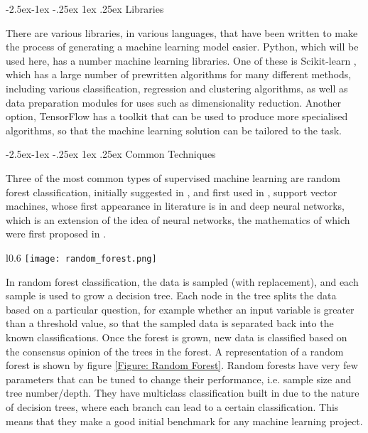 \documentclass[12pt]{article}
\makeatletter
\renewcommand\subsubsection{\@startsection{subsubsection}{4}{\z@}
            {-2.5ex\@plus -1ex \@minus -.25ex}
            {1ex \@plus .25ex}
            {\normalfont\large\bfseries}}
\makeatother
\begin{document}
			\subsubsection{Libraries}			
			
				There are various libraries, in various languages, that have been written to make the process of generating a machine learning model easier.  Python, which will be used here, has a number machine learning libraries.  One of these is Scikit-learn \citep{RefWorks:doc:5d80f150e4b07f40b9eab2f8}, which has a large number of prewritten algorithms for many different methods, including various classification, regression and clustering algorithms, as well as data preparation modules for uses such as dimensionality reduction.  Another option, TensorFlow \citep{RefWorks:doc:5d80f20de4b08a779635c81d} has a toolkit that can be used to produce more specialised algorithms, so that the machine learning solution can be tailored to the task.
				
			\subsubsection{Common Techniques}

				Three of the most common types of supervised machine learning are random forest classification, initially suggested in \cite{RefWorks:doc:5d84b84de4b03ee47d60013e}, and first used in \cite{RefWorks:doc:5d84b954e4b01cdccc094821}, support vector machines, whose first appearance in literature is in \cite{RefWorks:doc:5d84bca0e4b074abc390dc95} and deep neural networks, which is an extension of the idea of neural networks, the mathematics of which were first proposed in \cite{RefWorks:doc:5d84d2d4e4b048bf85a1aa0a}.  

		\begin{wrapfigure}{l}{0.6\textwidth}
			\centering
			\texttt{[image: random\_forest.png]}
			\caption{A simple illustration of a random forest, showing how each of a number (n) of samples makes a tree that contributes to the consensus that will be reported}
			\label{Figure: Random Forest}
		\end{wrapfigure}
		
				In random forest classification, the data is sampled (with replacement), and each sample is used to grow a decision tree.  Each node in the tree splits the data based on a particular question, for example whether an input variable is greater than a threshold value, so that the sampled data is separated back into the known classifications.  Once the forest is grown, new data is classified based on the consensus opinion of the trees in the forest.  A representation of a random forest is shown by figure \ref{Figure: Random Forest}.  Random forests have very few parameters that can be tuned to change their performance, i.e. sample size and tree number/depth.  They have multiclass classification built in due to the nature of decision trees, where each branch can lead to a certain classification.  This means that they make a good initial benchmark for any machine learning project.
		
\end{document}

